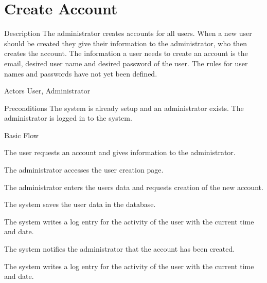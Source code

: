 \section{Create Account}


%
\begin{cpart}{Description}
The administrator creates accounts for all users. When a new user should be created they give their information to the administrator, who then creates the account. The information a user needs to create an account is the email, desired user name and desired password of the user. The rules for user names and passwords have not yet been defined.
\end{cpart}


%
\begin{cpart}{Actors}
User, Administrator
\end{cpart}

%
\begin{cpart}{Preconditions}
The system is already setup and an administrator exists. The administrator is logged in to the system.
\end{cpart}

%
\begin{cpartList}{Basic Flow}
  \item The user requests an account and gives information to the administrator.
  \item The administrator accesses the user creation page.
  \item The administrator enters the users data and requests creation of the new account.
  \item The system saves the user data in the database.
\item The system writes a log entry for the activity of the user with the current time and date.
  \item The system notifies the administrator that the account has been created.
    \item The system writes a log entry for the activity of the user with the current time and date.
\end{cpartList}

